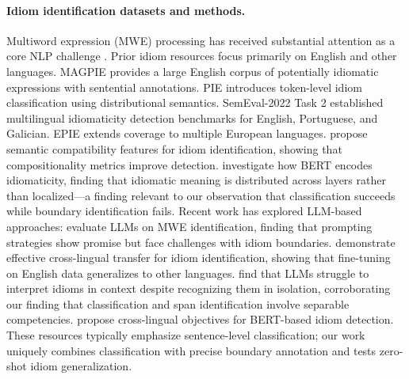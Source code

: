 \documentclass[11pt]{article}
\begin{document}
\paragraph{Idiom identification datasets and methods.}
Multiword expression (MWE) processing has received substantial attention as a core NLP challenge \citep{constant2017survey}. Prior idiom resources focus primarily on English and other languages. MAGPIE \citep{haagsma2020magpie} provides a large English corpus of potentially idiomatic expressions with sentential annotations. PIE \citep{salton2016idiom} introduces token-level idiom classification using distributional semantics. SemEval-2022 Task 2 \citep{peng2022semeval} established multilingual idiomaticity detection benchmarks for English, Portuguese, and Galician. EPIE \citep{tayyar2022epie} extends coverage to multiple European languages. \citet{zeng2021idiomatic} propose semantic compatibility features for idiom identification, showing that compositionality metrics improve detection. \citet{nedumpozhimana2021finding} investigate how BERT encodes idiomaticity, finding that idiomatic meaning is distributed across layers rather than localized---a finding relevant to our observation that classification succeeds while boundary identification fails. Recent work has explored LLM-based approaches: \citet{hashiloni2025easypie} evaluate LLMs on MWE identification, finding that prompting strategies show promise but face challenges with idiom boundaries. \citet{hefetz2025notjust} demonstrate effective cross-lingual transfer for idiom identification, showing that fine-tuning on English data generalizes to other languages. \citet{mi2024rolling} find that LLMs struggle to interpret idioms in context despite recognizing them in isolation, corroborating our finding that classification and span identification involve separable competencies. \citet{yayavaram2024bert} propose cross-lingual objectives for BERT-based idiom detection. These resources typically emphasize sentence-level classification; our work uniquely combines classification with precise boundary annotation and tests zero-shot idiom generalization.
\end{document}

